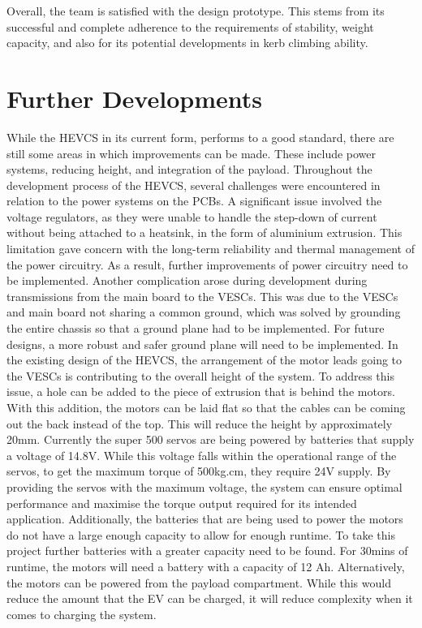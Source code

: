 \documentclass [12pt]{article}
\begin{document}
Overall, the team is satisfied with the design prototype. This stems from its successful and complete adherence to the requirements of stability, weight capacity, and also for its potential developments in kerb climbing ability.

\newpage
\section{Further Developments}

While the HEVCS in its current form, performs to a good standard, there are still some areas in which improvements can be made. These include power systems, reducing height, and integration of the payload.
Throughout the development process of the HEVCS, several challenges were encountered in relation to the power systems on the PCBs. A significant issue involved the voltage regulators, as they were unable to handle the step-down of current without being attached to a heatsink, in the form of aluminium extrusion. This limitation gave concern with the long-term reliability and thermal management of the power circuitry. As a result, further improvements of power circuitry need to be implemented.
Another complication arose during development during transmissions from the main board to the VESCs. This was due to the VESCs and main board not sharing a common ground, which was solved by grounding the entire chassis so that a ground plane had to be implemented. For future designs, a more robust and safer ground plane will need to be implemented.
In the existing design of the HEVCS, the arrangement of the motor leads going to the VESCs is contributing to the overall height of the system. To address this issue, a hole can be added to the piece of extrusion that is behind the motors. With this addition, the motors can be laid flat so that the cables can be coming out the back instead of the top. This will reduce the height by approximately 20mm.
Currently the super 500 servos are being powered by batteries that supply a voltage of 14.8V. While this voltage falls within the operational range of the servos, to get the maximum torque of 500kg.cm, they require 24V supply. By providing the servos with the maximum voltage, the system can ensure optimal performance and maximise the torque output required for its intended application.
Additionally, the batteries that are being used to power the motors do not have a large enough capacity to allow for enough runtime. To take this project further batteries with a greater capacity need to be found. For 30mins of runtime, the motors will need a battery with a capacity of 12 Ah. Alternatively, the motors can be powered from the payload compartment. While this would reduce the amount that the EV can be charged, it will reduce complexity when it comes to charging the system.
\end{document}
